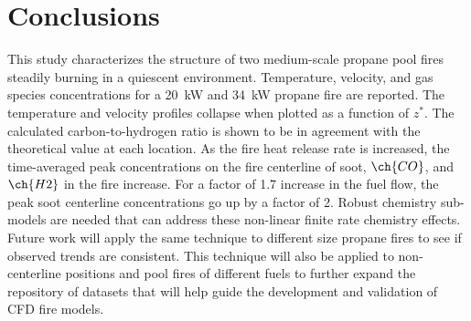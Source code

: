 \documentclass[12pt]{ussci}
\begin{document}
\section{Conclusions}
This study characterizes the structure of two medium-scale propane pool fires steadily burning in a quiescent environment. Temperature, velocity, and gas species concentrations for a 20~kW and 34~kW propane fire are reported. The temperature and velocity profiles collapse when plotted as a function of $z^*$. The calculated carbon-to-hydrogen ratio is shown to be in agreement with the theoretical value at each location. As the fire heat release rate is increased, the time-averaged peak concentrations on the fire centerline of soot, $\ch{CO}$, and $\ch{H2}$ in the fire increase.  For a factor of 1.7 increase in the fuel flow, the peak soot centerline concentrations go up by a factor of 2. Robust chemistry sub-models are needed that can address these non-linear finite rate chemistry effects. Future work will apply the same technique to different size propane fires to see if observed trends are consistent. This technique will also be applied to non-centerline positions and pool fires of different fuels to further expand the repository of datasets that will help guide the development and validation of CFD fire models.


%

\printbibliography
\end{document}
